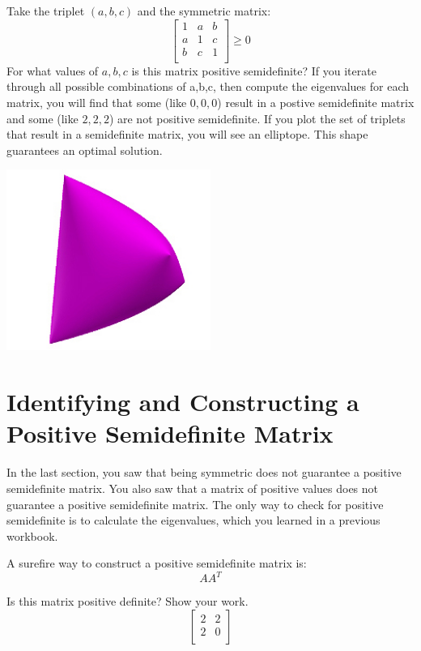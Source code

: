 Take the triplet $(a, b, c)$ and the symmetric matrix:
$$
\begin{bmatrix}
 1  & a & b  \\
 a  & 1 & c  \\
 b  & c & 1  \\
\end{bmatrix}
\geq 0
$$
For what values of $a, b, c$ is this matrix positive semidefinite? If you iterate through all possible combinations of a,b,c, then compute the eigenvalues for each matrix, you will find that some (like $0,0,0$) result in a postive semidefinite matrix and some (like $2, 2, 2 $) are not positive semidefinite. If you plot the set of triplets that result in a semidefinite matrix, you will see an elliptope. This shape guarantees an optimal solution.

\includegraphics[width=0.5\textwidth]{elliptope.jpg}

\section{Identifying and Constructing a Positive Semidefinite Matrix}
In the last section, you saw that being symmetric does not guarantee a positive semidefinite matrix. You also saw that a matrix of positive values does not guarantee a positive semidefinite matrix. The only way to check for positive semidefinite is to calculate the eigenvalues, which you learned in a previous workbook.

A surefire way to construct a positive semidefinite matrix is:
$$AA^{T}$$

\begin{Exercise}[title={Figuring out if a matrix is positive semidefinite}, label=pos-matrix-01]
Is this matrix positive definite? Show your work.
$$
\begin{bmatrix}
 2  & 2 \\
 2  & 0 \\
\end{bmatrix}
$$
\end{Exercise}

